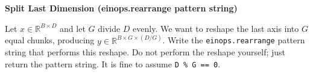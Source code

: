 \item {} \textbf{Split Last Dimension (einops.rearrange pattern string)}

Let $x \in \mathbb{R}^{B\times D}$ and let $G$ divide $D$ evenly. We want to reshape the last axis into $G$ equal chunks, producing $y \in \mathbb{R}^{B\times G\times (D/G)}$. Write the \texttt{einops.rearrange} pattern string that performs this reshape. Do not perform the reshape yourself; just return the pattern string. It is fine to assume \texttt{D \% G == 0}.

